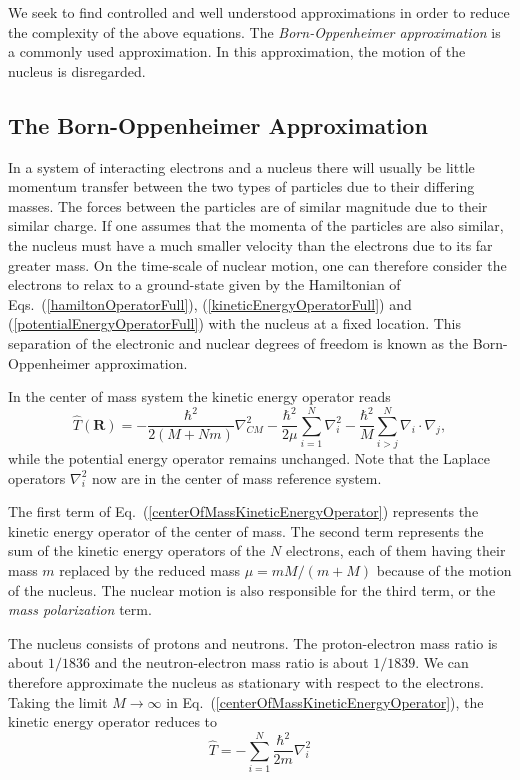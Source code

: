 We seek to find controlled and well understood approximations in order
to reduce the complexity of the above equations. The
\emph{Born-Oppenheimer approximation} is a commonly used
approximation. In this approximation, the motion of the nucleus is disregarded.

\subsection{The Born-Oppenheimer Approximation}

In a system of interacting electrons and a nucleus there will usually
be little momentum transfer between the two types of particles due to
their differing masses. The forces between the particles are 
of similar magnitude due to their similar charge. If one assumes
that the momenta of the particles are also similar, the nucleus
must have a much smaller velocity than the electrons due to its far
greater mass. On the time-scale of nuclear motion, one can therefore
consider the electrons to relax to a ground-state given by the
Hamiltonian of Eqs.~(\ref{hamiltonOperatorFull}),
(\ref{kineticEnergyOperatorFull}) and
(\ref{potentialEnergyOperatorFull}) with the nucleus at a fixed
location. This separation of the electronic and nuclear degrees of
freedom is known as the Born-Oppenheimer approximation. 

In the center of mass system the
kinetic energy operator reads
\begin{equation}
  \hat{T}(\mathbf{R}) = -\frac{\hbar^2}{2(M+Nm)}\nabla^2_{CM}
  -\frac{\hbar^2}{2\mu}\sum_{i=1}^{N}\nabla^2_i
  -\frac{\hbar^2}{M}\sum_{i>j}^{N}\nabla_i\cdot\nabla_j,
  \label{centerOfMassKineticEnergyOperator}
\end{equation}
while the potential energy operator remains unchanged. Note that the
Laplace operators $\nabla^2_i$ now are in the center of mass reference
system.

The first term of Eq.~(\ref{centerOfMassKineticEnergyOperator})
represents the kinetic energy operator of the center of mass. The
second term represents the sum of the kinetic energy operators of the
$N$ electrons, each of them having their mass $m$ replaced by the
reduced mass $\mu = mM/(m+M)$ because of the motion of the
nucleus. The nuclear motion is also responsible for the third term,
or the \emph{mass polarization} term.

The nucleus consists of protons
and neutrons. The proton-electron mass ratio is about
$1 / 1836$ and the neutron-electron mass ratio is about
$1 / 1839$. We can therefore approximate the nucleus as stationary with respect to the electrons. 
Taking the limit $M\to \infty$ in
Eq.~(\ref{centerOfMassKineticEnergyOperator}), the kinetic energy 
operator reduces to
\[
  \hat{T} = -\sum_{i=1}^{N}\frac{\hbar^2}{2m}\nabla^2_i
\]


